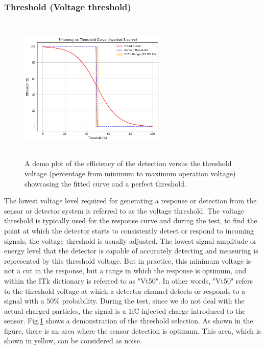 \subsubsection{Threshold (Voltage threshold)}
\begin{figure}
    \centering
    \includegraphics[width=7cm,height=7cm,keepaspectratio]{Figures/modules/threshold.png}
    \caption{A demo plot of the efficiency of the detection versus the threshold voltage (percentage from minimum to maximum operation voltage) showcasing the fitted curve and a perfect threshold.}
    \label{fig:threshold}
\end{figure}
The lowest voltage level required for generating a response or detection from the sensor or detector system is referred to as the voltage threshold. The voltage threshold is typically used for the response curve and during the test, to find the point at which the detector starts to consistently detect or respond to incoming signals, the voltage threshold is usually adjusted. The lowest signal amplitude or energy level that the detector is capable of accurately detecting and measuring is represented by this threshold voltage. But in practice, this minimum voltage is not a cut in the response, but a range in which the response is optimum, and within the ITk dictionary is referred to as "Vt50".  In other words, "Vt50" refers to the threshold voltage at which a detector channel detects or responds to a signal with a $50\%$ probability. During the test, since we do not deal with the actual charged particles, the signal is a $1 \si{\femto\coulomb}$ injected charge introduced to the sensor. Fig.\ref{fig:threshold} shows a demonstration of the threshold selection. As shown in the figure, there is an area where the sensor detection is optimum. This area, which is shown in yellow, can be considered as noise. 

